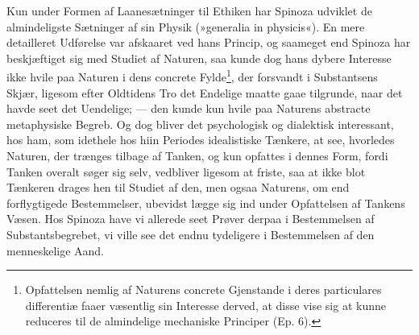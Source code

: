 \documentclass[12pt,a4paper]{book}
\newcommand{\opage}[1]{\marginnote{\footnotesize\textit{[#1]}}}
\begin{document}
Kun under Formen af Laanesætninger til Ethiken har Spinoza
udviklet de almindeligste Sætninger af sin Physik (»generalia in
physicis«). En mere detailleret Udførelse var afskaaret ved hans
Princip, og saameget end Spinoza har beskjæftiget sig med Studiet
af Naturen, saa kunde dog hans dybere Interesse ikke hvile paa
Naturen i dens concrete Fylde\footnote{Opfattelsen nemlig af
Naturens concrete Gjenstande i deres particulares differentiæ
faaer væsentlig sin Interesse derved, at disse vise sig at kunne
reduceres til de almindelige mechaniske Principer (Ep. 6).}, der
forsvandt i Substantsens Skjær, ligesom efter Oldtidens Tro det
Endelige maatte gaae tilgrunde, naar det havde seet det
Uendelige; --- den kunde kun hvile paa Naturens abstracte
metaphysiske Begreb. Og dog bliver det
\opage{82} psychologisk og dialektisk interessant, hos ham, som idethele hos hiin Periodes idealistiske Tænkere, at see, hvorledes
Naturen, der trænges tilbage af Tanken, og kun opfattes i
dennes Form, fordi Tanken overalt søger sig selv, vedbliver
ligesom at friste, saa at ikke blot Tænkeren drages hen til
Studiet af den, men ogsaa Naturens, om end forflygtigede
Bestemmelser, ubevidst lægge sig ind under Opfattelsen af
Tankens Væsen. Hos Spinoza have vi allerede seet Prøver
derpaa i Bestemmelsen af Substantsbegrebet, vi ville see det
endnu tydeligere i Bestemmelsen af den menneskelige Aand.
\end{document}
